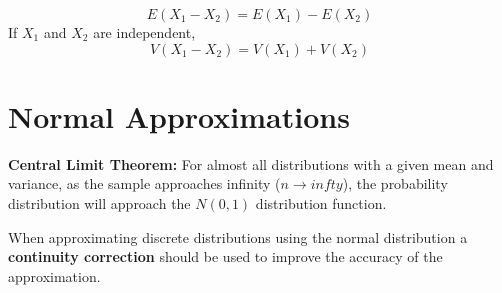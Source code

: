 \documentclass[english, 12pt]{article}
\begin{document}
\[E(X_{1} - X_{2}) = E(X_{1}) - E(X_{2})\]
If $X_{1}$ and $X_{2}$ are independent,
\[V(X_{1} - X_{2}) = V(X_{1}) + V(X_{2})\]


\section{Normal Approximations}

\begin{defn}
\textbf{Central Limit Theorem: }
For almost all distributions with a given mean and variance, as the sample approaches infinity ($n \to infty$), the probability distribution will approach the $N(0,1)$ distribution function.
\end{defn}

\begin{note}
When approximating discrete distributions using the normal distribution a \textbf{continuity correction} should be used to improve the accuracy of the approximation.
\end{note}
\end{document}

